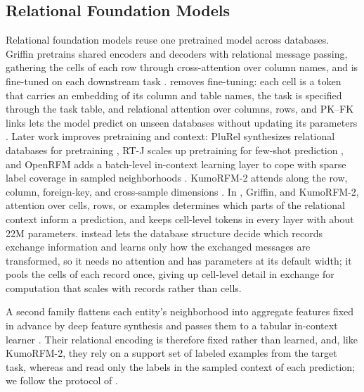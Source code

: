 \subsection{Relational Foundation Models}
Relational foundation models reuse one pretrained model across databases.
Griffin pretrains shared encoders and decoders with relational message
passing, gathering the cells of each row through cross-attention over column
names, and is fine-tuned on each downstream task \citep{wang2025griffin}.
\RT{} removes fine-tuning: each cell is a token that carries an embedding of
its column and table names, the task is specified through the task table,
and relational attention over columns, rows, and PK--FK links lets the model
predict on unseen databases without updating its parameters
\citep{ranjan2026rt}. Later work improves pretraining and context: PluRel
synthesizes relational databases for pretraining
\citep{kothapalli2026plurel}, RT-J scales up pretraining for few-shot
prediction \citep{ranjan2026rtj}, and OpenRFM adds a batch-level in-context
learning layer to cope with sparse label coverage in sampled neighborhoods
\citep{chen2026openrfm}. KumoRFM-2 attends along the row, column, foreign-key,
and cross-sample dimensions \citep{hudovernik2026kumorfm2}. In \RT{}, Griffin,
and KumoRFM-2, attention over cells, rows, or examples determines which parts
of the relational context inform a prediction, and \RT{} keeps cell-level
tokens in every layer with about 22M parameters. \model{} instead lets the
database structure decide which records exchange information and learns only
how the exchanged messages are transformed, so it needs no attention and has
\mainParams{} parameters at its default width; it pools the
cells of each record once, giving up cell-level detail in exchange for
computation that scales with records rather than cells.

A second family flattens each entity's neighborhood into aggregate features
fixed in advance by deep feature synthesis and passes them to a tabular
in-context learner \citep{xu2026rdblearn,wang2026rdbpfn}. Their relational
encoding is therefore fixed rather than learned, and, like KumoRFM-2, they
rely on a support set of labeled
examples from the target task, whereas \RT{} and \model{} read only the
labels in the sampled context of each prediction; we follow the protocol of
\RT{}.

